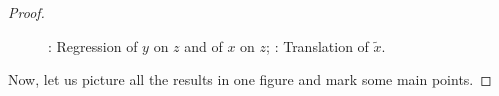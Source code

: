 \documentclass[nobib]{tufte-handout}
\begin{document}
\begin{proof}
\begin{figure}[ht!]
\begin{center}
\hspace{4ex}
\caption{: Regression of $y$ on $z$ and of $x$ on $z$; : Translation of $\tilde{x}$.}
\end{center}
\end{figure}

Now, let us picture all the results in one figure and mark some main points.


\end{proof}
\end{document}
